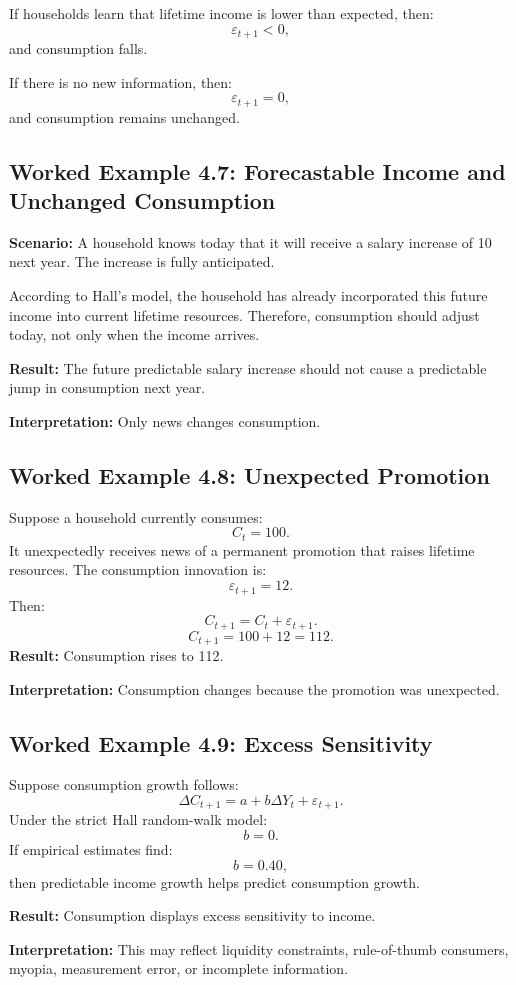 \documentclass[12pt,a4paper]{article}
\begin{document}
If households learn that lifetime income is lower than expected, then:
\[ \varepsilon_{t+1} < 0, \]
and consumption falls.

If there is no new information, then:
\[ \varepsilon_{t+1} = 0, \]
and consumption remains unchanged.

\subsection*{Worked Example 4.7: Forecastable Income and Unchanged Consumption}
\textbf{Scenario:} A household knows today that it will receive a salary increase of 10 next year. The increase is fully anticipated.

According to Hall's model, the household has already incorporated this future income into current lifetime resources. Therefore, consumption should adjust today, not only when the income arrives.

\textbf{Result:} The future predictable salary increase should not cause a predictable jump in consumption next year.

\textbf{Interpretation:} Only news changes consumption.

\subsection*{Worked Example 4.8: Unexpected Promotion}
Suppose a household currently consumes:
\[ C_t = 100. \]
It unexpectedly receives news of a permanent promotion that raises lifetime resources. The consumption innovation is:
\[ \varepsilon_{t+1} = 12. \]
Then:
\[ C_{t+1} = C_t + \varepsilon_{t+1}. \]
\[ C_{t+1} = 100 + 12 = 112. \]
\textbf{Result:} Consumption rises to 112.

\textbf{Interpretation:} Consumption changes because the promotion was unexpected.

\subsection*{Worked Example 4.9: Excess Sensitivity}
Suppose consumption growth follows:
\[ \Delta C_{t+1} = a + b \Delta Y_t + \varepsilon_{t+1}. \]
Under the strict Hall random-walk model:
\[ b = 0. \]
If empirical estimates find:
\[ b = 0.40, \]
then predictable income growth helps predict consumption growth.

\textbf{Result:} Consumption displays excess sensitivity to income.

\textbf{Interpretation:} This may reflect liquidity constraints, rule-of-thumb consumers, myopia, measurement error, or incomplete information.
\end{document}
